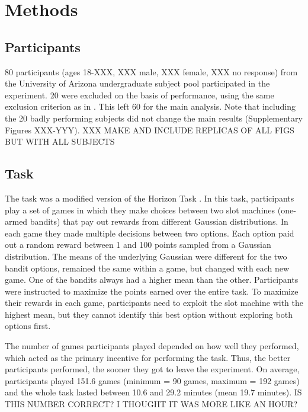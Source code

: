 \documentclass[12pt]{article}
\begin{document}
	
	\section*{Methods}
	\subsection*{Participants}
	
	80 participants (ages 18-XXX, XXX male, XXX female, XXX no response) from the University of Arizona undergraduate subject pool participated in the experiment.  20 were excluded on the basis of performance, using the same exclusion criterion as in \citep{wilson2014}. This left 60 for the main analysis. Note that including the 20 badly performing subjects did not change the main results (Supplementary Figures XXX-YYY). XXX MAKE AND INCLUDE REPLICAS OF ALL FIGS BUT WITH ALL SUBJECTS
	
	
	\subsection*{Task}
	The task was a modified version of the Horizon Task \citep{wilson2014}. In this task, participants play a set of games in which they make choices between two slot machines (one-armed bandits) that pay out rewards from different Gaussian distributions. In each game they made multiple decisions between two options. Each option paid out a random reward between 1 and 100 points sampled from a Gaussian distribution. The means of the underlying Gaussian were different for the two bandit options, remained the same within a game, but changed with each new game. One of the bandits always had a higher mean than the other. Participants were instructed to maximize the points earned over the entire task. To maximize their rewards in each game, participants need to exploit the slot machine with the highest mean, but they cannot identify this best option without exploring both options first. 
	
	The number of games participants played depended on how well they performed, which acted as the primary incentive for performing the task. Thus, the better participants performed, the sooner they got to leave the experiment. On average, participants played 151.6 games (minimum = 90 games, maximum = 192 games) and the whole task lasted between 10.6 and 29.2 minutes (mean 19.7 minutes).  IS THIS NUMBER CORRECT?  I THOUGHT IT WAS MORE LIKE AN HOUR?%
	
\end{document}
